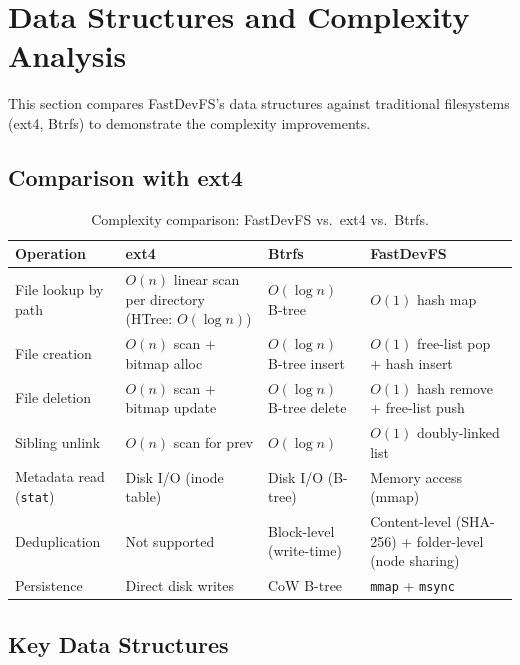 \documentclass[12pt, a4paper]{article}
\begin{document}
\section{Data Structures and Complexity Analysis}

This section compares FastDevFS's data structures against traditional filesystems (ext4, Btrfs) to demonstrate the complexity improvements.

\subsection{Comparison with ext4}

\begin{table}[H]
\centering
\begin{tabular}{p{3.5cm}p{3.5cm}p{3.5cm}p{3.5cm}}
\toprule
\textbf{Operation} & \textbf{ext4} & \textbf{Btrfs} & \textbf{FastDevFS} \\
\midrule
File lookup by path & $O(n)$ linear scan per directory (HTree: $O(\log n)$) & $O(\log n)$ B-tree & $O(1)$ hash map \\
\midrule
File creation & $O(n)$ scan + bitmap alloc & $O(\log n)$ B-tree insert & $O(1)$ free-list pop + hash insert \\
\midrule
File deletion & $O(n)$ scan + bitmap update & $O(\log n)$ B-tree delete & $O(1)$ hash remove + free-list push \\
\midrule
Sibling unlink & $O(n)$ scan for prev & $O(\log n)$ & $O(1)$ doubly-linked list \\
\midrule
Metadata read (\texttt{stat}) & Disk I/O (inode table) & Disk I/O (B-tree) & Memory access (mmap) \\
\midrule
Deduplication & Not supported & Block-level (write-time) & Content-level (SHA-256) + folder-level (node sharing) \\
\midrule
Persistence & Direct disk writes & CoW B-tree & \texttt{mmap} + \texttt{msync} \\
\bottomrule
\end{tabular}
\caption{Complexity comparison: FastDevFS vs.\ ext4 vs.\ Btrfs.}
\label{tab:complexity}
\end{table}

\subsection{Key Data Structures}
\end{document}
